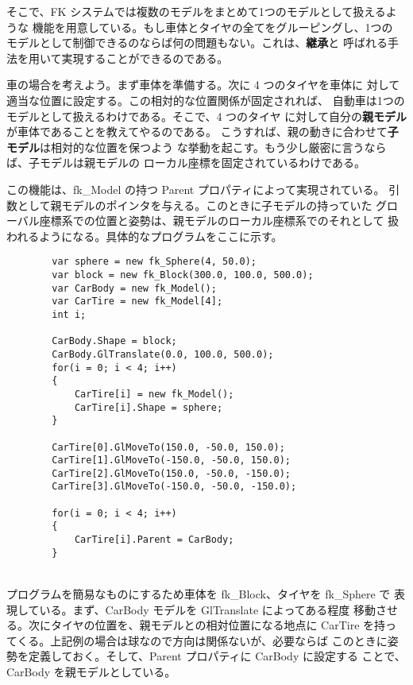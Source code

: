 そこで、FK システムでは複数のモデルをまとめて1つのモデルとして扱えるような
機能を用意している。もし車体とタイヤの全てをグルーピングし、1つの
モデルとして制御できるのならば何の問題もない。これは、\textbf{継承}と
呼ばれる手法を用いて実現することができるのである。

車の場合を考えよう。まず車体を準備する。次に 4 つのタイヤを車体に
対して適当な位置に設定する。この相対的な位置関係が固定されれば、
自動車は1つのモデルとして扱えるわけである。そこで、4 つのタイヤ
に対して自分の\textbf{親モデル}が車体であることを教えてやるのである。
こうすれば、親の動きに合わせて\textbf{子モデル}は相対的な位置を保つよう
な挙動を起こす。もう少し厳密に言うならば、子モデルは親モデルの
ローカル座標を固定されているわけである。

この機能は、fk\_Model の持つ Parent プロパティによって実現されている。
引数として親モデルのポインタを与える。このときに子モデルの持っていた
グローバル座標系での位置と姿勢は、親モデルのローカル座標系でのそれとして
扱われるようになる。具体的なプログラムをここに示す。
\\
\begin{breakbox}
\begin{verbatim}
        var sphere = new fk_Sphere(4, 50.0);
        var block = new fk_Block(300.0, 100.0, 500.0);
        var CarBody = new fk_Model();
        var CarTire = new fk_Model[4];
        int i;

        CarBody.Shape = block;
        CarBody.GlTranslate(0.0, 100.0, 500.0);
        for(i = 0; i < 4; i++)
        {
            CarTire[i] = new fk_Model();
            CarTire[i].Shape = sphere;
        }

        CarTire[0].GlMoveTo(150.0, -50.0, 150.0);
        CarTire[1].GlMoveTo(-150.0, -50.0, 150.0);
        CarTire[2].GlMoveTo(150.0, -50.0, -150.0);
        CarTire[3].GlMoveTo(-150.0, -50.0, -150.0);

        for(i = 0; i < 4; i++)
        {
            CarTire[i].Parent = CarBody;
        }
\end{verbatim}
\end{breakbox}
~ \\
プログラムを簡易なものにするため車体を fk\_Block、タイヤを fk\_Sphere で
表現している。まず、CarBody モデルを GlTranslate によってある程度
移動させる。次にタイヤの位置を、親モデルとの相対位置になる地点に
CarTire を持ってくる。上記例の場合は球なので方向は関係ないが、必要ならば
このときに姿勢を定義しておく。そして、Parent プロパティに CarBody に設定する
ことで、CarBody を親モデルとしている。

